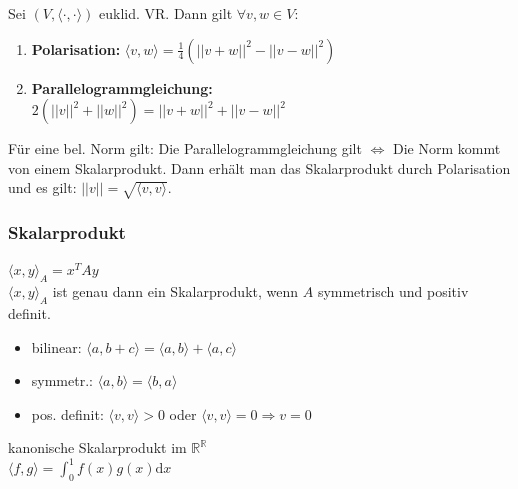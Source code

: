 \documentclass[german, fourcolumn, 8pt]{latex4ei/latex4ei_sheet}
\newcommand{\equival}[0]{\ensuremath{\Longleftrightarrow}}
\begin{document}
\begin{sectionbox}
    Sei $(V, \langle \cdot, \cdot \rangle)$ euklid. VR. Dann gilt $\forall v,w \in V$:
    \begin{enumerate}
        \item \textbf{Polarisation:} $\langle v,w \rangle = \frac{1}{4}(||v+w||^2-||v-w||^2)$
        \item \textbf{Parallelogrammgleichung:}\\
              $2(||v||^2+||w||^2)=||v+w||^2+||v-w||^2$
    \end{enumerate}

    Für eine bel. Norm gilt: Die Parallelogrammgleichung gilt \equival \: Die Norm kommt von einem Skalarprodukt. Dann erhält man das Skalarprodukt durch Polarisation und es gilt: $||v||=\sqrt{\langle v, v \rangle}$.
\end{sectionbox}

\begin{sectionbox}
    \subsubsection{Skalarprodukt}
    $\langle x, y\rangle_A = x^TAy$\\
    $\langle x, y \rangle_A$ ist genau dann ein Skalarprodukt, wenn $A$ symmetrisch und positiv definit.
    \begin{itemize}
        \item bilinear: $\langle a,b+c\rangle = \langle a,b\rangle + \langle a,c \rangle$
        \item symmetr.: $\langle a,b \rangle = \langle b,a \rangle$
        \item pos. definit: $\langle v,v\rangle > 0$ oder $\langle v,v\rangle = 0 \Rightarrow v = 0$
    \end{itemize}

    kanonische Skalarprodukt im $\mathbb R^\mathbb R$\\
    \(
    \langle f, g \rangle = \int_{0}^{1}f(x)g(x)\mathrm dx
    \)
\end{sectionbox}
\end{document}
